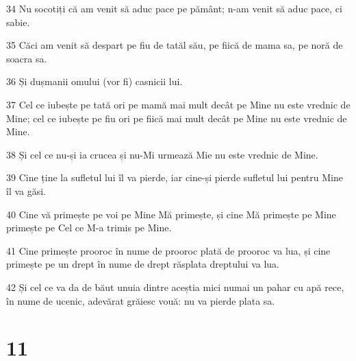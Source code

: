 \par 34 Nu socotiți că am venit să aduc pace pe pământ; n-am venit să aduc pace, ci sabie.
\par 35 Căci am venit să despart pe fiu de tatăl său, pe fiică de mama sa, pe noră de soacra sa.
\par 36 Și dușmanii omului (vor fi) casnicii lui.
\par 37 Cel ce iubește pe tată ori pe mamă mai mult decât pe Mine nu este vrednic de Mine; cel ce iubește pe fiu ori pe fiică mai mult decât pe Mine nu este vrednic de Mine.
\par 38 Și cel ce nu-și ia crucea și nu-Mi urmează Mie nu este vrednic de Mine.
\par 39 Cine ține la sufletul lui îl va pierde, iar cine-și pierde sufletul lui pentru Mine îl va găsi.
\par 40 Cine vă primește pe voi pe Mine Mă primește, și cine Mă primește pe Mine primește pe Cel ce M-a trimis pe Mine.
\par 41 Cine primește prooroc în nume de prooroc plată de prooroc va lua, și cine primește pe un drept în nume de drept răsplata dreptului va lua.
\par 42 Și cel ce va da de băut unuia dintre aceștia mici numai un pahar cu apă rece, în nume de ucenic, adevărat grăiesc vouă: nu va pierde plata sa.

\chapter{11}

